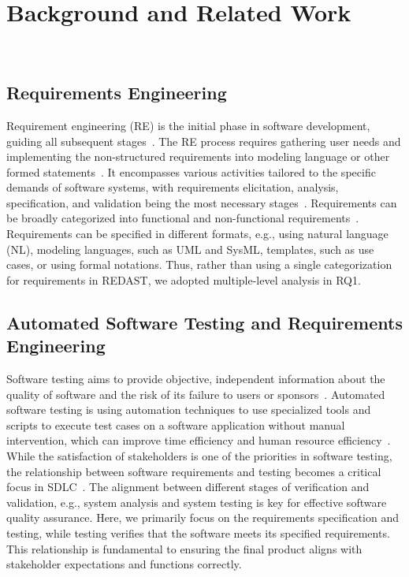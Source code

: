 \section{Background and Related Work}~\label{sec:RelatedWork}

\subsection{Requirements Engineering}
Requirement engineering (RE) is the initial phase in software development, guiding all subsequent stages~\cite{requirements_survey_02, requirements_chetan}. The RE process requires gathering user needs and implementing the non-structured requirements into modeling language or other formed statements~\cite{requirements_terms,requirements_book_pohl}. It encompasses various activities tailored to the specific demands of software systems, with requirements elicitation, analysis, specification, and validation being the most necessary stages~\cite{requirements_survey_03,requirements_book_kotonya}. Requirements can be broadly categorized into functional and non-functional requirements~\cite{nonfunctional}. Requirements can be specified in different formats, e.g., using natural language (NL), modeling languages, such as UML and SysML, templates, such as use cases, or using formal notations. Thus, rather than using a single categorization for requirements in REDAST, we adopted multiple-level analysis in RQ1.

\subsection{Automated Software Testing and Requirements Engineering}

Software testing aims to provide objective, independent information about the quality of software and the risk of its failure to users or sponsors~\cite{testing_define_01,testing_define_02}. Automated software testing is using automation techniques to use specialized tools and scripts to execute test cases on a software application without manual intervention, which can improve time efficiency and human resource efficiency~\cite{rafi2012benefits, deming2021software}. While the satisfaction of stakeholders is one of the priorities in software testing, the relationship between software requirements and testing becomes a critical focus in SDLC~\cite{vmodel_sdlc_01,vmodel_sdlc_02}. The alignment between different stages of verification and validation, e.g., system analysis and system testing is key for effective software quality assurance. Here, we primarily focus on the requirements specification and testing, while testing verifies that the software meets its specified requirements. This relationship is fundamental to ensuring the final product aligns with stakeholder expectations and functions correctly.

